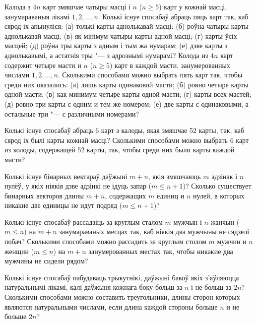 \begin{problemList}
\bigskip

\problemItemSimple
{Калода з $4n$ карт змяшчае чатыры масці і $n$ ($n \ge 5$) карт у кожнай масці,
занумараваныя лікамі $1, 2, \ldots, n$. Колькі існуе спосабаў абраць пяць карт так,
каб сярод іх апынуліся: (а) толькі карты аднолькавай масці; (б) роўна чатыры карты
аднолькавай масці; (в) як мінімум чатыры карты адной масці; (г) карты ўсіх масцей;
(д) роўна тры карты з адным і тым жа нумарам; (е) дзве карты з аднолькавымі, а астатнія тры "---
з адрознымі нумарамі?}
{Колода из $4n$ карт содержит четыре масти и $n$ ($n \ge 5$) карт в
каждой масти, занумерованных числами $1, 2, \ldots, n$. Сколькими
способами можно выбрать пять карт так, чтобы среди них оказались: (а)
лишь карты одинаковой масти; (б) ровно четыре карты одной масти; (в)
как минимум четыре карты одной масти; (г) карты всех мастей; (д) ровно
три карты с одним и тем же номером; (е) две карты с одинаковыми, а
остальные три "--- с различными номерами?}

\bigskip

\problemItemSimple
{Колькі існуе спосабаў абраць 6 карт з калоды, якая змяшчае 52 карты, так,
каб сярод іх былі карты кожнай масці?}
{Сколькими способами можно выбрать 6 карт из колоды, содержащей 52
карты, так, чтобы среди них были карты каждой масти?}

\bigskip

\problemItemSimple
{Колькі існуе бінарных вектараў даўжыні $m + n$, якія змяшчаюць $m$ адзінак і
$n$ нулёў, у якіх ніякія дзве адзінкі не ідуць запар ($m \le n + 1$)?}
{Сколько существует бинарных векторов длины $m + n$, содержащих $m$
единиц и $n$ нулей, в которых никакие две единицы не идут подряд
($m \le n + 1$)?}

\bigskip

\problemItemSimple
{Колькі існуе спосабаў рассадзіць за круглым сталом $m$ мужчын і $n$ жанчын
($m \le n$) на $m + n$ занумараваных месцах так, каб ніякія два мужчыны не сядзелі побач?}
{Сколькими способами можно рассадить за круглым столом $m$ мужчин и $n$
женщин ($m \le n$) на $m + n$ занумерованных местах так, чтобы никакие
два мужчины не сидели рядом?}

\bigskip

\problemItemSimple
{Колькі існуе спосабаў пабудаваць трыкутнікі, даўжыні бакоў якіх з'яўляюцца натуральнымі лікамі,
калі даўжыня кожнага боку больш за $n$ і не больш за $2n$?}
{Сколькими способами можно составить треугольники, длины сторон которых
являются натуральными числами, если длина каждой стороны больше $n$ и
не больше $2n$?}


\end{problemList}
